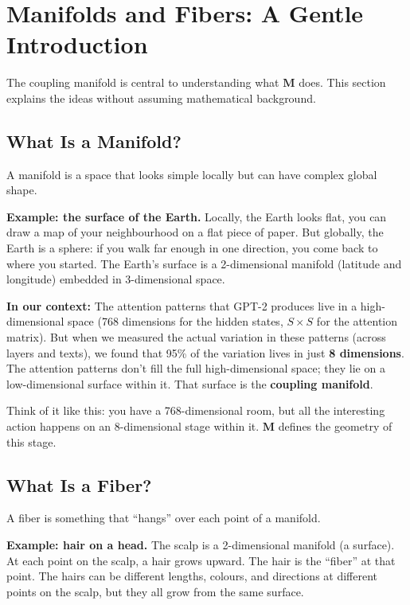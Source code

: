 \documentclass[11pt, a4paper]{article}
\newcommand{\M}{\mathbf{M}}
\theoremstyle{remark}
\begin{document}
\section{Manifolds and Fibers: A Gentle Introduction}
\label{sec:manifolds}

The coupling manifold is central to understanding what $\M$ does.
This section explains the ideas without assuming mathematical background.

\subsection{What Is a Manifold?}

A manifold is a space that looks simple locally but can have complex global shape.

\textbf{Example: the surface of the Earth.}
Locally, the Earth looks flat, you can draw a map of your neighbourhood on a flat piece of paper.
But globally, the Earth is a sphere: if you walk far enough in one direction, you come back to where you started.
The Earth's surface is a 2-dimensional manifold (latitude and longitude) embedded in 3-dimensional space.

\textbf{In our context:}
The attention patterns that GPT-2 produces live in a high-dimensional space (768 dimensions for the hidden states, $S \times S$ for the attention matrix).
But when we measured the actual variation in these patterns (across layers and texts), we found that 95\% of the variation lives in just \textbf{8 dimensions}.
The attention patterns don't fill the full high-dimensional space; they lie on a low-dimensional surface within it.
That surface is the \textbf{coupling manifold}.

Think of it like this: you have a 768-dimensional room, but all the interesting action happens on an 8-dimensional stage within it.
$\M$ defines the geometry of this stage.

\subsection{What Is a Fiber?}

A fiber is something that ``hangs'' over each point of a manifold.

\textbf{Example: hair on a head.}
The scalp is a 2-dimensional manifold (a surface).
At each point on the scalp, a hair grows upward.
The hair is the ``fiber'' at that point.
The hairs can be different lengths, colours, and directions at different points on the scalp, but they all grow from the same surface.
\end{document}
